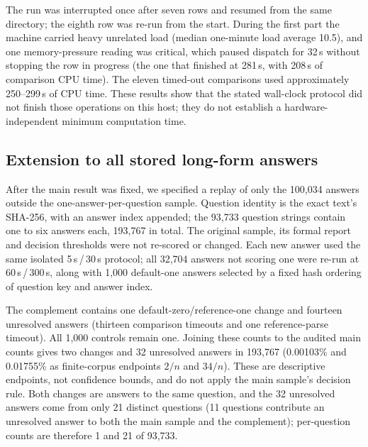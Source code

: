 \documentclass[11pt,a4paper]{article}
\begin{document}
The run was interrupted once after seven rows and resumed from the same directory; the eighth row was re-run from the start. During the first part the machine carried heavy unrelated load (median one-minute load average 10.5), and one memory-pressure reading was critical, which paused dispatch for 32\,s without stopping the row in progress (the one that finished at 281\,s, with 208\,s of comparison CPU time). The eleven timed-out comparisons used approximately 250--299\,s of CPU time. These results show that the stated wall-clock protocol did not finish those operations on this host; they do not establish a hardware-independent minimum computation time.

\subsection{Extension to all stored long-form answers}
After the main result was fixed, we specified a replay of only the 100,034 answers outside the one-answer-per-question sample. Question identity is the exact text's SHA-256, with an answer index appended; the 93,733 question strings contain one to six answers each, 193,767 in total. The original sample, its formal report and decision thresholds were not re-scored or changed. Each new answer used the same isolated 5\,s\,/\,30\,s protocol; all 32,704 answers not scoring one were re-run at 60\,s\,/\,300\,s, along with 1,000 default-one answers selected by a fixed hash ordering of question key and answer index.

The complement contains one default-zero/reference-one change and fourteen unresolved answers (thirteen comparison timeouts and one reference-parse timeout). All 1,000 controls remain one. Joining these counts to the audited main counts gives two changes and 32 unresolved answers in 193,767 (0.00103\% and 0.01755\% as finite-corpus endpoints $2/n$ and $34/n$). These are descriptive endpoints, not confidence bounds, and do not apply the main sample's decision rule. Both changes are answers to the same question, and the 32 unresolved answers come from only 21 distinct questions (11 questions contribute an unresolved answer to both the main sample and the complement); per-question counts are therefore 1 and 21 of 93,733.
\end{document}
